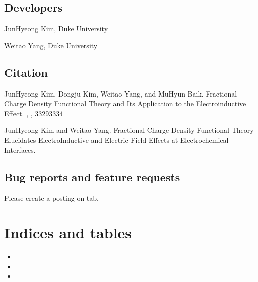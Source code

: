 \documentclass[letterpaper,10pt,english]{sphinxmanual}
\begin{document}
\section{Developers}
\label{\detokenize{about:developers}}
\sphinxAtStartPar
Jun\sphinxhyphen{}Hyeong Kim, Duke University

\sphinxAtStartPar
Weitao Yang, Duke University


\section{Citation}
\label{\detokenize{about:citation}}
\sphinxAtStartPar
Jun\sphinxhyphen{}Hyeong Kim, Dongju Kim, Weitao Yang, and Mu\sphinxhyphen{}Hyun Baik. Fractional Charge Density Functional Theory and Its Application to the Electro\sphinxhyphen{}inductive Effect.  , , 3329\sphinxhyphen{}3334

\sphinxAtStartPar
Jun\sphinxhyphen{}Hyeong Kim and Weitao Yang. Fractional Charge Density Functional Theory Elucidates Electro\sphinxhyphen{}Inductive and Electric Field Effects at Electrochemical Interfaces. 


\section{Bug reports and feature requests}
\label{\detokenize{about:bug-reports-and-feature-requests}}
\sphinxAtStartPar
Please create a posting on  tab.


\chapter{Indices and tables}
\label{\detokenize{index:indices-and-tables}}\begin{itemize}
\item {} 
\sphinxAtStartPar
{}

\item {} 
\sphinxAtStartPar
{}

\item {} 
\sphinxAtStartPar
{}

\end{itemize}



\renewcommand{\indexname}{Index}
\printindex
\end{document}
